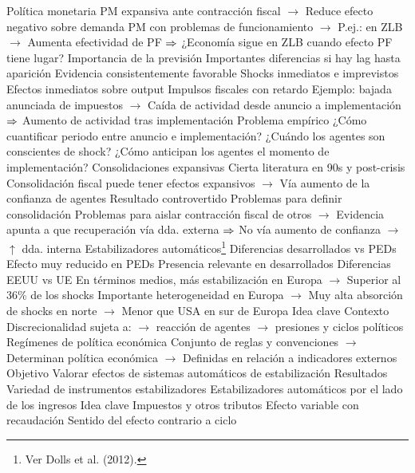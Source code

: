 \documentclass{nuevotema}
\begin{document}
\begin{esquemal}
				\4 Política monetaria
				\4[] PM expansiva ante contracción fiscal
				\4[] $\to$ Reduce efecto negativo sobre demanda
				\4[] PM con problemas de funcionamiento
				\4[] $\to$ P.ej.: en ZLB
				\4[] $\to$ Aumenta efectividad de PF
				\4[] $\Rightarrow$ ¿Economía sigue en ZLB cuando efecto PF tiene lugar?
			\3 Importancia de la previsión
				\4 Importantes diferencias si hay lag hasta aparición
				\4[] Evidencia consistentemente favorable
				\4 Shocks inmediatos e imprevistos
				\4[] Efectos inmediatos sobre output
				\4 Impulsos fiscales con retardo
				\4[] Ejemplo: bajada anunciada de impuestos
				\4[] $\to$ Caída de actividad desde anuncio a implementación
				\4[] $\Rightarrow$ Aumento de actividad tras implementación
				\4 Problema empírico
				\4[] ¿Cómo cuantificar periodo entre anuncio e implementación?
				\4[] ¿Cuándo los agentes son conscientes de shock?
				\4[] ¿Cómo anticipan los agentes el momento de implementación?
			\3 Consolidaciones expansivas
				\4 Cierta literatura en 90s y post-crisis
				\4[] Consolidación fiscal puede tener efectos expansivos
				\4[] $\to$ Vía aumento de la confianza de agentes
				\4 Resultado controvertido
				\4[] Problemas para definir consolidación
				\4[] Problemas para aislar contracción fiscal de otros
				\4[] $\to$ Evidencia apunta a que recuperación vía dda. externa
				\4[] $\Rightarrow$ No vía aumento de confianza $\to$ $\uparrow$ dda. interna
			\3 Estabilizadores automáticos\footnote{Ver Dolls et al. (2012).}
				\4 Diferencias desarrollados vs PEDs
				\4[] Efecto muy reducido en PEDs
				\4[] Presencia relevante en desarrollados
				\4 Diferencias EEUU vs UE
				\4[] En términos medios, más estabilización en Europa
				\4[] $\to$ Superior al 36\% de los shocks
				\4[] Importante heterogeneidad en Europa
				\4[] $\to$ Muy alta absorción de shocks en norte
				\4[] $\to$ Menor que USA en sur de Europa
	\1 
		\2 Idea clave
			\3 Contexto
				\4 Discrecionalidad sujeta a:
				\4[] $\to$ reacción de agentes
				\4[] $\to$ presiones y ciclos políticos
				\4 Regímenes de política económica
				\4[] Conjunto de reglas y convenciones
				\4[] $\to$ Determinan política económica
				\4[] $\to$ Definidas en relación a indicadores externos
			\3 Objetivo
				\4 Valorar efectos de sistemas automáticos de estabilización
			\3 Resultados
				\4 Variedad de instrumentos estabilizadores
		\2 Estabilizadores automáticos por el lado de los ingresos
			\3 Idea clave
				\4 Impuestos y otros tributos
				\4 Efecto variable con recaudación
				\4 Sentido del efecto contrario a ciclo

\end{esquemal}
\end{document}
